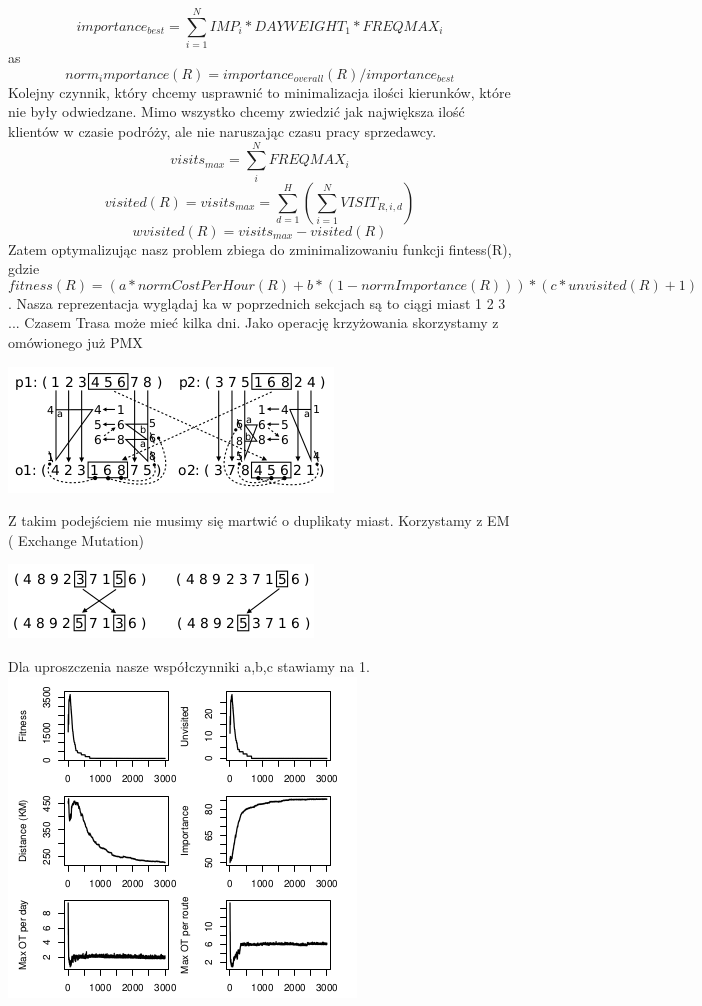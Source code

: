 \documentclass[11pt]{article}
\begin{document}
$$importance_{best}= \sum^N_{i=1} IMP_i*DAYWEIGHT_1*FREQMAX_i$$
as
$$ norm_importance(R)= importance_{overall}(R)/ importance_{best}$$
Kolejny czynnik, który chcemy usprawnić to minimalizacja ilości kierunków, które nie były odwiedzane. Mimo wszystko chcemy zwiedzić jak największa ilość klientów w czasie podróży, ale nie naruszając czasu pracy sprzedawcy. $$visits_{max}=\sum^N_iFREQMAX_i$$
$$visited(R) = visits_{max} =\sum^H_{d=1}(\sum^N_{i=1}VISIT_{R,i,d})$$ 
$$ wvisited(R)=visits_{max} - visited(R)$$ Zatem optymalizując nasz problem zbiega do zminimalizowaniu funkcji fintess(R), gdzie 
$$fitness(R)=( a * normCostPerHour(R) +
b * ( 1 - normImportance(R) ) ) *
( c * unvisited(R) + 1 )$$. Nasza reprezentacja wyglądaj ka w poprzednich sekcjach są to ciągi miast 1 2 3 ... Czasem Trasa może mieć kilka dni. Jako operację krzyżowania skorzystamy z omówionego już PMX 
\begin{center}
\includegraphics[scale=1.0]{pmx.png}
\end{center}
Z takim podejściem nie musimy się martwić o duplikaty miast. Korzystamy z EM ( Exchange Mutation)
\begin{center}
\includegraphics[scale=1.0]{ex.png}
\end{center}
Dla uproszczenia nasze współczynniki a,b,c stawiamy na 1.
\includegraphics[scale=1.0]{gr1.png}
\end{document}
